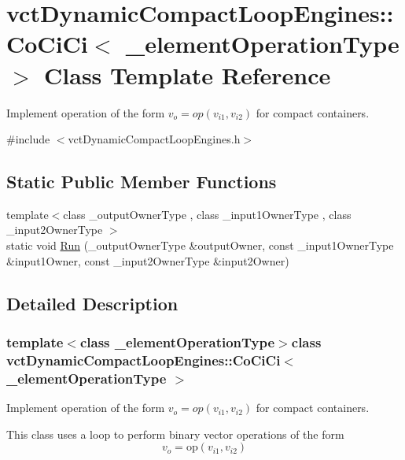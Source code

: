 \hypertarget{classvct_dynamic_compact_loop_engines_1_1_co_ci_ci}{}\section{vct\+Dynamic\+Compact\+Loop\+Engines\+:\+:Co\+Ci\+Ci$<$ \+\_\+element\+Operation\+Type $>$ Class Template Reference}
\label{classvct_dynamic_compact_loop_engines_1_1_co_ci_ci}


Implement operation of the form $v_o = op(v_{i1}, v_{i2})$ for compact containers.  




{\ttfamily \#include $<$vct\+Dynamic\+Compact\+Loop\+Engines.\+h$>$}

\subsection*{Static Public Member Functions}
\begin{DoxyCompactItemize}
\item 
{\footnotesize template$<$class \+\_\+output\+Owner\+Type , class \+\_\+input1\+Owner\+Type , class \+\_\+input2\+Owner\+Type $>$ }\\static void \hyperlink{classvct_dynamic_compact_loop_engines_1_1_co_ci_ci_a929d4840f5b71152518d72eecf03b5db}{Run} (\+\_\+output\+Owner\+Type \&output\+Owner, const \+\_\+input1\+Owner\+Type \&input1\+Owner, const \+\_\+input2\+Owner\+Type \&input2\+Owner)
\end{DoxyCompactItemize}


\subsection{Detailed Description}
\subsubsection*{template$<$class \+\_\+element\+Operation\+Type$>$class vct\+Dynamic\+Compact\+Loop\+Engines\+::\+Co\+Ci\+Ci$<$ \+\_\+element\+Operation\+Type $>$}

Implement operation of the form $v_o = op(v_{i1}, v_{i2})$ for compact containers. 

This class uses a loop to perform binary vector operations of the form \[ v_o = \mathrm{op}(v_{i1}, v_{i2}) \]


